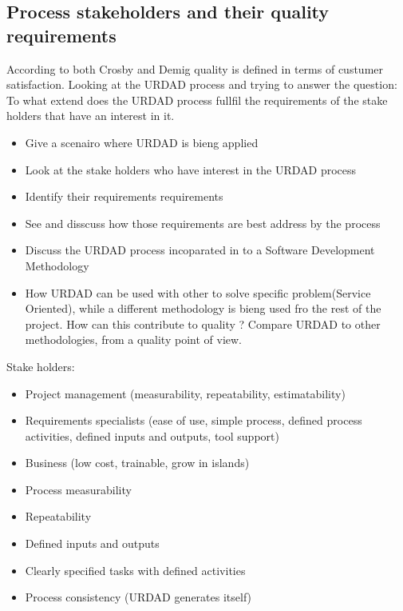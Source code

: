 
\subsection{Process stakeholders and their quality requirements}

According to both Crosby and Demig quality is defined in terms of custumer satisfaction. Looking at the URDAD process and trying to answer the 
question: To what extend does the URDAD process fullfil the requirements of the stake holders that have an interest in it. 

\begin {itemize}
 \item Give a scenairo where URDAD is bieng applied
 \item Look at the stake holders who have interest in the URDAD process 
 \item Identify their requirements requirements
 \item See and disscuss how those requirements are best address by the process
\end {itemize}

\begin {itemize}
 \item Discuss the URDAD process incoparated in to a Software Development Methodology
 \item How URDAD can be used with other to solve specific problem(Service Oriented),
  while a different methodology is bieng used fro the rest of the project. How can this contribute to quality ?
  Compare URDAD to other methodologies, from a quality point of view.
\end {itemize}


\cite{berard_what_1995}

Stake holders:
\begin{itemize}
  \item Project management (measurability, repeatability, estimatability)
  \item Requirements specialists (ease of use, simple process, defined process activities, defined inputs and outputs, tool support)
  \item Business (low cost, trainable, grow in islands)
\end{itemize}


\begin{itemize}
  \item Process measurability
  \item Repeatability
  \item Defined inputs and outputs
  \item Clearly specified tasks with defined activities
  \item Process consistency (URDAD generates itself)
\end{itemize}


